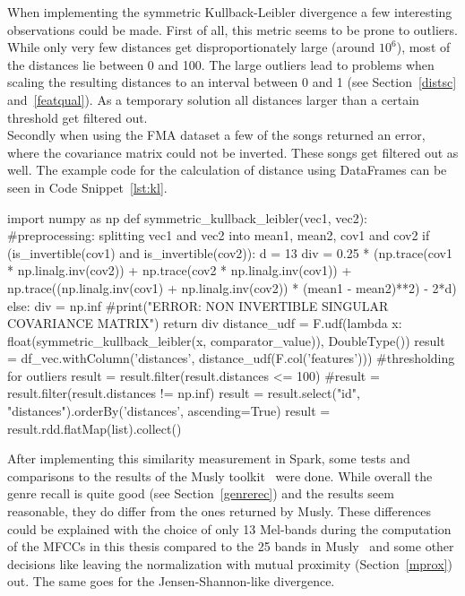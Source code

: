When implementing the symmetric Kullback-Leibler divergence a few interesting observations could be made. First of all, this metric seems to be prone to outliers. While only very few distances get disproportionately large (around $10^6$), most of the distances lie between 0 and 100. The large outliers lead to problems when scaling the resulting distances to an interval between 0 and 1 (see Section~\ref{distsc} and~\ref{featqual}). As a temporary solution all distances larger than a certain threshold get filtered out.\\ 
Secondly when using the FMA dataset a few of the songs returned an error, where the covariance matrix could not be inverted. 
These songs get filtered out as well. The example code for the calculation of distance using DataFrames can be seen in Code Snippet~\ref{lst:kl}. 

\begin{pythonCode}[frame=single,label={lst:kl},caption={Kullback-Leibler divergence},captionpos=b]
import numpy as np
def symmetric_kullback_leibler(vec1, vec2):
	#preprocessing: splitting vec1 and vec2 into mean1, mean2, cov1 and cov2
	if (is_invertible(cov1) and is_invertible(cov2)):
		d = 13
		div = 0.25 * (np.trace(cov1 * np.linalg.inv(cov2)) + np.trace(cov2 * np.linalg.inv(cov1)) + np.trace((np.linalg.inv(cov1) + np.linalg.inv(cov2)) * (mean1 - mean2)**2) - 2*d)
	else: 
		div = np.inf
		#print("ERROR: NON INVERTIBLE SINGULAR COVARIANCE MATRIX\n")  
	return div
distance_udf = F.udf(lambda x: float(symmetric_kullback_leibler(x, comparator_value)), DoubleType())
result = df_vec.withColumn('distances', distance_udf(F.col('features')))
#thresholding for outliers
result = result.filter(result.distances <= 100)  
#result = result.filter(result.distances != np.inf)        
result = result.select("id", "distances").orderBy('distances', ascending=True)
result = result.rdd.flatMap(list).collect()
\end{pythonCode}

\noindent After implementing this similarity measurement in Spark, some tests and comparisons to the results of the Musly toolkit~\cite{musly1} were done. While overall the genre recall is quite good (see Section~\ref{genrerec}) and the results seem reasonable, they do differ from the ones returned by Musly. 
These differences could be explained with the choice of only 13 Mel-bands during the computation of the MFCCs in this thesis compared to the 25 bands in Musly~\cite{musly1} and some other decisions like leaving the normalization with mutual proximity (Section~\ref{mprox}) out. The same goes for the Jensen-Shannon-like divergence. 


